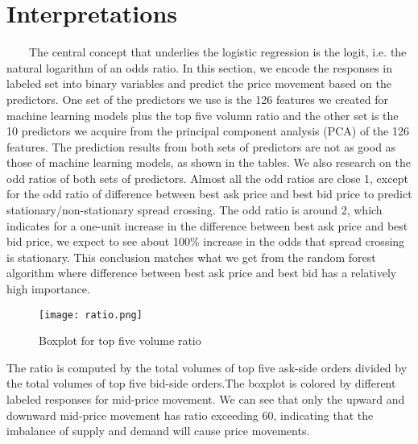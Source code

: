 \documentclass[11pt]{article}
\begin{document}
\section{Interpretations}
\ \ \ \ The central concept that underlies the logistic regression is the logit, i.e. the natural logarithm of an odds ratio. In this section, we encode the responses in labeled set into binary variables and predict the price movement based on the predictors. One set of the predictors we use is the 126 features we created for machine learning models plus the top five volumn ratio and the other set is the 10 predictors we acquire from the principal component analysis (PCA) of the 126 features. The prediction results from both sets of predictors are not as good as those of machine learning models, as shown in the tables. We also research on the odd ratios of both sets of predictors. Almost all the odd ratios are close 1, except for the odd ratio of difference between best ask price and best bid price to predict stationary/non-stationary spread crossing. The odd ratio is around 2, which indicates for a one-unit increase in the difference between best ask price and best bid price, we expect to see about 100\% increase in the odds that spread crossing is stationary. This conclusion matches what we get from the random forest algorithm where difference between best ask price and best bid has a relatively high importance.
\begin{multicols}{2}
	\begin{flushleft}
    \begin{figure}[H]
       \caption{Boxplot for top five volume ratio}
      \texttt{[image: ratio.png]}
      \end{figure}
    \end{flushleft}
  \begin{flushleft}
The ratio is computed by the total volumes of top five ask-side orders divided by the total volumes of top five bid-side orders.The boxplot is colored by different labeled responses for mid-price movement. We can see that only the upward and downward mid-price movement has ratio exceeding 60, indicating that the imbalance of supply and demand will cause price movements. 
\end{flushleft}
\end{multicols}   
\end{document}
